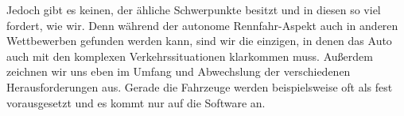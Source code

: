 Jedoch gibt es keinen, der ähliche Schwerpunkte besitzt und in diesen so viel fordert, wie wir.
Denn während der autonome Rennfahr-Aspekt auch in anderen Wettbewerben gefunden werden kann, sind wir die einzigen, in denen das Auto auch mit den komplexen Verkehrssituationen
klarkommen muss. Außerdem zeichnen wir uns eben im Umfang und Abwechslung der verschiedenen Herausforderungen aus.
Gerade die Fahrzeuge werden beispielsweise oft als fest vorausgesetzt und es kommt nur auf die Software an.


